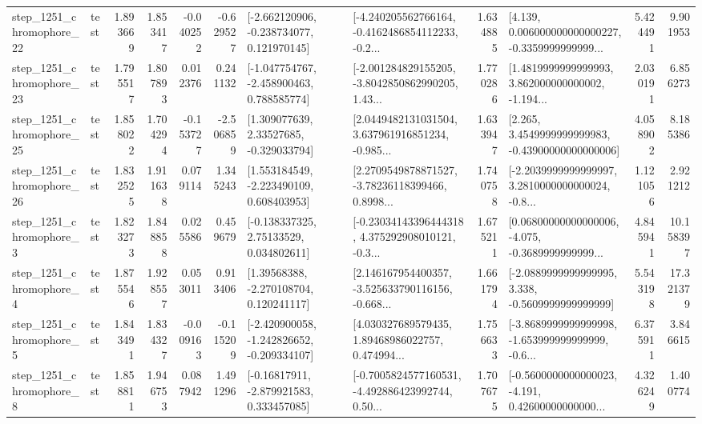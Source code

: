 \begin{tabular}{llrrrrllrlrr}
 step\_1251\_chromophore\_22 &      test &      1.893669 &    1.853417 &     -0.040252 & -0.629527 &   [-2.662120906, -0.238734077, 0.121970145] &  [-4.240205562766164, -0.4162486854112233, -0.2... &       1.634885 &  [4.139, 0.006000000000000227, -0.3359999999999... &            5.424491 &          9.901953 \\
 step\_1251\_chromophore\_23 &      test &      1.795517 &    1.807893 &      0.012376 &  0.241132 &   [-1.047754767, -2.458900463, 0.788585774] &  [-2.001284829155205, -3.8042850862990205, 1.43... &       1.770286 &  [1.4819999999999993, 3.862000000000002, -1.194... &            2.030191 &          6.856273 \\
 step\_1251\_chromophore\_25 &      test &      1.858022 &    1.704294 &     -0.153727 & -2.506859 &     [1.309077639, 2.33527685, -0.329033794] &  [2.0449482131031504, 3.637961916851234, -0.985... &       1.633947 &  [2.265, 3.4549999999999983, -0.43900000000000006] &            4.058902 &          8.185386 \\
 step\_1251\_chromophore\_26 &      test &      1.832525 &    1.911638 &      0.079114 &  1.345243 &    [1.553184549, -2.223490109, 0.608403953] &  [2.2709549878871527, -3.78236118399466, 0.8998... &       1.740758 &  [-2.2039999999999997, 3.2810000000000024, -0.8... &            1.121056 &          2.921212 \\
  step\_1251\_chromophore\_3 &      test &      1.823273 &    1.848858 &      0.025586 &  0.459679 &     [-0.138337325, 2.75133529, 0.034802611] &  [-0.23034143396444318, 4.375292908010121, -0.3... &       1.675211 &  [0.06800000000000006, -4.075, -0.3689999999999... &            4.845941 &         10.158397 \\
  step\_1251\_chromophore\_4 &      test &      1.875546 &    1.928557 &      0.053011 &  0.913406 &     [1.39568388, -2.270108704, 0.120241117] &  [2.146167954400357, -3.525633790116156, -0.668... &       1.661794 &  [-2.0889999999999995, 3.338, -0.5609999999999999] &            5.543198 &         17.321379 \\
  step\_1251\_chromophore\_5 &      test &      1.843491 &    1.834327 &     -0.009163 & -0.115209 &  [-2.420900058, -1.242826652, -0.209334107] &  [4.030327689579435, 1.89468986022757, 0.474994... &       1.756633 &  [-3.8689999999999998, -1.653999999999999, -0.6... &            6.375911 &          3.846615 \\
  step\_1251\_chromophore\_8 &      test &      1.858811 &    1.946753 &      0.087942 &  1.491296 &    [-0.16817911, -2.879921583, 0.333457085] &  [-0.7005824577160531, -4.492886423992744, 0.50... &       1.707675 &  [-0.5600000000000023, -4.191, 0.42600000000000... &            4.326249 &          1.400774 \\

\end{tabular}
